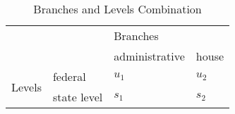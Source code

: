 \clearpage
\begin{table}[H]
    \centering
    \caption{Branches and Levels Combination}
    \begin{tabular}{cp{7.145em}p{8.43em}p{6.145em}}
        \toprule
        \multicolumn{2}{c}{\multirow{2}[4]{*}{}}       & \multicolumn{2}{p{14.575em}}{Branches}                 \\
        \cmidrule{3-4}    \multicolumn{2}{c}{}         & administrative                         & house         \\
        \midrule
        \multicolumn{1}{c}{\multirow{2}[4]{*}{Levels}} & federal                                & $u_1$ & $u_2$ \\
        \cmidrule{2-4}                                 & state level                            & $s_1$ & $s_2$ \\
        \bottomrule
    \end{tabular}%
    \label{Table 2.6}%
\end{table}%
\clearpage

